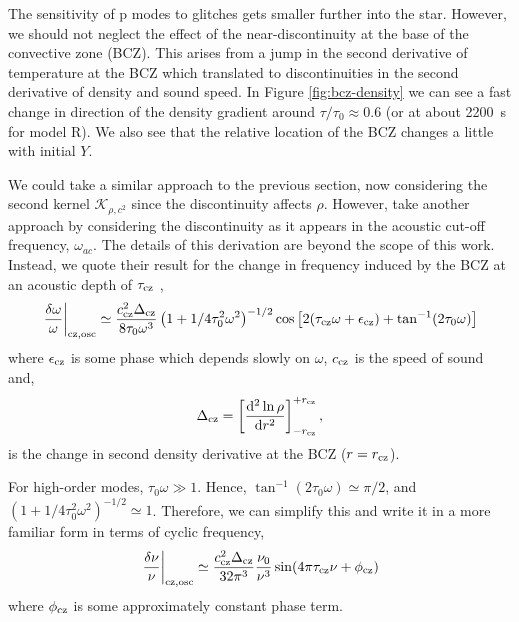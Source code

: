 The sensitivity of p modes to glitches gets smaller further into the star. However, we should not neglect the effect of the near-discontinuity at the base of the convective zone (BCZ). This arises from a jump in the second derivative of temperature at the BCZ which translated to discontinuities in the second derivative of density and sound speed. In Figure \ref{fig:bcz-density} we can see a fast change in direction of the density gradient around \(\tau/\tau_0 \approx 0.6\) (or at about \SI{2200}{\second} for model R). We also see that the relative location of the BCZ changes a little with initial \(Y\).


We could take a similar approach to the previous section, now considering the second kernel \(\mathcal{K}_{\rho,c^2}\) since the discontinuity affects \(\rho\). However, \citet{Houdek.Gough2007} take another approach by considering the discontinuity as it appears in the acoustic cut-off frequency, \(\omega_{ac}\). The details of this derivation are beyond the scope of this work. Instead, we quote their result for the change in frequency induced by the BCZ at an acoustic depth of \(\tau_{{\mathrm{cz}}}\) \citep[cf.][Eq. 17]{Houdek.Gough2007},
%
\begin{equation}
    \left.\frac{\delta\omega}{\omega}\right|_{{\mathrm{cz}},\mathrm{osc}} \simeq \frac{c_{{\mathrm{cz}}}^2\Delta_{{\mathrm{cz}}}}{8\tau_0 \omega^3} \left(1 + {1}/{4\tau_0^2\omega^2}\right)^{-1/2} \cos\left[2(\tau_{{\mathrm{cz}}} \omega + \epsilon_{{\mathrm{cz}}}) + \tan^{-1}(2\tau_0\omega)\right]
\end{equation}
%
where \(\epsilon_{{\mathrm{cz}}}\) is some phase which depends slowly on \(\omega\), \(c_{{\mathrm{cz}}}\) is the speed of sound and,
%
\begin{equation}
    \Delta_{{\mathrm{cz}}} = \left[\frac{\mathrm{d}^2 \ln\rho}{\mathrm{d} r^2}\right]_{-r_{{\mathrm{cz}}}}^{+r_{{\mathrm{cz}}}},
\end{equation}
%
is the change in second density derivative at the BCZ (\(r = r_{{\mathrm{cz}}}\)).

For high-order modes, \(\tau_0 \omega \gg 1\). Hence, \(\tan^{-1}(2\tau_0\omega) \simeq \pi/2\), and \((1 + {1}/{4\tau_0^2\omega^2})^{-1/2} \simeq 1\). Therefore, we can simplify this and write it in a more familiar form in terms of cyclic frequency,
%
\begin{equation}
    \left.\frac{\delta\nu}{\nu}\right|_{{\mathrm{cz}},\mathrm{osc}} \simeq \frac{c_{{\mathrm{cz}}}^2\Delta_{{\mathrm{cz}}}}{32\pi^3}\frac{\nu_0}{\nu^3} \sin(4\pi\tau_{{\mathrm{cz}}}\nu + \phi_{{\mathrm{cz}}}) \label{eq:bcz-osc}
\end{equation}
%
where \(\phi_{{\mathrm{cz}}}\) is some approximately constant phase term.

